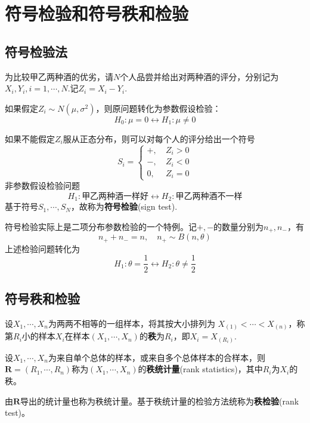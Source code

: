 \documentclass{ctexbook}
\begin{document}
\section{符号检验和符号秩和检验}

\subsection{符号检验法}

\begin{example}
    为比较甲乙两种酒的优劣，请$N$个人品尝并给出对两种酒的评分，分别记为$X_i,Y_i,i=1,\cdots,N$.记$Z_i=X_i-Y_i$.

    如果假定$Z_i\sim N(\mu,\sigma^2)$，则原问题转化为参数假设检验：
    $$H_0:\mu=0\leftrightarrow H_1:\mu\neq 0$$

    如果不能假定$Z_i$服从正态分布，则可以对每个人的评分给出一个符号
    $$S_i=\begin{cases}
        +,&\ Z_i>0\\
        -,&\ Z_i<0\\
        0,&\ Z_i=0
    \end{cases}$$
    非参数假设检验问题
    $$H_1:\text{甲乙两种酒一样好}\leftrightarrow H_2:\text{甲乙两种酒不一样}$$
    基于符号$S_1,\cdots,S_N$，故称为\textbf{符号检验}(sign test).
\end{example}

符号检验实际上是二项分布参数检验的一个特例。记$+,-$的数量分别为$n_+,n_-$，有
$$n_+ +n_- =n,\quad n_+\sim B(n,\theta)$$
上述检验问题转化为
$$H_1:\theta=\frac{1}{2}\leftrightarrow H_2:\theta\neq\frac{1}{2}$$

\subsection{符号秩和检验}

\begin{definition}
    设$X_1,\cdots,X_n$为两两不相等的一组样本，将其按大小排列为
    $X_{(1)}<\cdots<X_{(n)}$，称第$R_i$小的样本$X_i$在样本$(X_1,\cdots,X_n)$的\textbf{秩}为$R_i$，即$X_i=X_{(R_i)}$.
\end{definition}

\begin{definition}
    设$X_1,\cdots,X_n$为来自单个总体的样本，或来自多个总体样本的合样本，则$\mathbf{R}=(R_1,\cdots,R_n)$称为$(X_1,\cdots,X_n)$的\textbf{秩统计量}(rank statistics)，其中$R_i$为$X_i$的秩。

    由$\mathbf{R}$导出的统计量也称为秩统计量。基于秩统计量的检验方法统称为\textbf{秩检验}(rank test)。
\end{definition}
\end{document}
